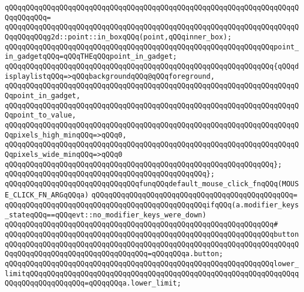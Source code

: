 \verb|qQQqqQQqqQQqqQQqqQQqqQQqqQQqqQQqqQQqqQQqqQQqqQQqqQQqqQQqqQQqqQQqqQQqqQQqqQQqqQQq=|\newline
\verb|qQQqqQQqqQQqqQQqqQQqqQQqqQQqqQQqqQQqqQQqqQQqqQQqqQQqqQQqqQQqqQQqqQQqqQQqqQQqqQQqg2d::point::in_boxqQQq(point,qQQqinner_box);|\newline
\newline
\verb|qQQqqQQqqQQqqQQqqQQqqQQqqQQqqQQqqQQqqQQqqQQqqQQqqQQqqQQqqQQqqQQqpoint_in_gadgetqQQq=qQQqTHEqQQqpoint_in_gadget;|\newline
\newline
\newline
\verb|qQQqqQQqqQQqqQQqqQQqqQQqqQQqqQQqqQQqqQQqqQQqqQQqqQQqqQQqqQQqqQQq{qQQqdisplaylistqQQq=>qQQqbackgroundqQQq@qQQqforeground,|\newline
\verb|qQQqqQQqqQQqqQQqqQQqqQQqqQQqqQQqqQQqqQQqqQQqqQQqqQQqqQQqqQQqqQQqqQQqqQQqpoint_in_gadget,|\newline
\verb|qQQqqQQqqQQqqQQqqQQqqQQqqQQqqQQqqQQqqQQqqQQqqQQqqQQqqQQqqQQqqQQqqQQqqQQqpoint_to_value,|\newline
\verb|qQQqqQQqqQQqqQQqqQQqqQQqqQQqqQQqqQQqqQQqqQQqqQQqqQQqqQQqqQQqqQQqqQQqqQQqpixels_high_minqQQq=>qQQq0,|\newline
\verb|qQQqqQQqqQQqqQQqqQQqqQQqqQQqqQQqqQQqqQQqqQQqqQQqqQQqqQQqqQQqqQQqqQQqqQQqpixels_wide_minqQQq=>qQQq0|\newline
\verb|qQQqqQQqqQQqqQQqqQQqqQQqqQQqqQQqqQQqqQQqqQQqqQQqqQQqqQQqqQQqqQQq};|\newline
\verb|qQQqqQQqqQQqqQQqqQQqqQQqqQQqqQQqqQQqqQQqqQQqqQQq};|\newline
\newline
\verb|qQQqqQQqqQQqqQQqqQQqqQQqqQQqqQQqfunqQQqdefault_mouse_click_fnqQQq(MOUSE_CLICK_FN_ARGqQQqa)|\newline
\verb|qQQqqQQqqQQqqQQqqQQqqQQqqQQqqQQqqQQqqQQqqQQqqQQq=|\newline
\verb|qQQqqQQqqQQqqQQqqQQqqQQqqQQqqQQqqQQqqQQqqQQqqQQqifqQQq(a.modifier_keys_stateqQQq==qQQqevt::no_modifier_keys_were_down)|\newline
\verb|qQQqqQQqqQQqqQQqqQQqqQQqqQQqqQQqqQQqqQQqqQQqqQQqqQQqqQQqqQQqqQQq#|\newline
\verb|qQQqqQQqqQQqqQQqqQQqqQQqqQQqqQQqqQQqqQQqqQQqqQQqqQQqqQQqqQQqqQQqbuttonqQQqqQQqqQQqqQQqqQQqqQQqqQQqqQQqqQQqqQQqqQQqqQQqqQQqqQQqqQQqqQQqqQQqqQQqqQQqqQQqqQQqqQQqqQQqqQQqqQQqqQQq=qQQqqQQqa.button;|\newline
\verb|qQQqqQQqqQQqqQQqqQQqqQQqqQQqqQQqqQQqqQQqqQQqqQQqqQQqqQQqqQQqqQQqlower_limitqQQqqQQqqQQqqQQqqQQqqQQqqQQqqQQqqQQqqQQqqQQqqQQqqQQqqQQqqQQqqQQqqQQqqQQqqQQqqQQqqQQq=qQQqqQQqa.lower_limit;|\newline
